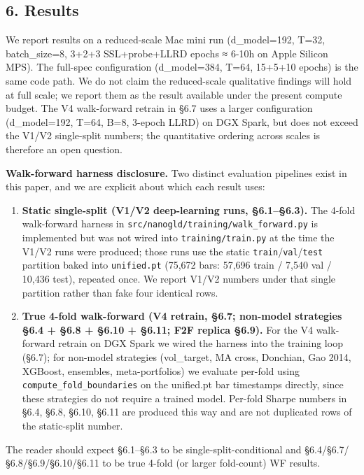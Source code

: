 \documentclass[
]{article}
\begin{document}
\subsection{6. Results}\label{results}

We report results on a reduced-scale Mac mini run (d\_model=192, T=32,
batch\_size=8, 3+2+3 SSL+probe+LLRD epochs ≈ 6-10h on Apple Silicon
MPS). The full-spec configuration (d\_model=384, T=64, 15+5+10 epochs)
is the same code path. We do not claim the reduced-scale qualitative
findings will hold at full scale; we report them as the result available
under the present compute budget. The V4 walk-forward retrain in §6.7
uses a larger configuration (d\_model=192, T=64, B=8, 3-epoch LLRD) on
DGX Spark, but does not exceed the V1/V2 single-split numbers; the
quantitative ordering across scales is therefore an open question.

\textbf{Walk-forward harness disclosure.} Two distinct evaluation
pipelines exist in this paper, and we are explicit about which each
result uses:

\begin{enumerate}
\def\labelenumi{\arabic{enumi}.}
\item
  \textbf{Static single-split (V1/V2 deep-learning runs, §6.1--§6.3).}
  The 4-fold walk-forward harness in
  \texttt{src/nanogld/training/walk\_forward.py} is implemented but was
  not wired into \texttt{training/train.py} at the time the V1/V2 runs
  were produced; those runs use the static
  \texttt{train}/\texttt{val}/\texttt{test} partition baked into
  \texttt{unified.pt} (75,672 bars: 57,696 train / 7,540 val / 10,436
  test), repeated once. We report V1/V2 numbers under that single
  partition rather than fake four identical rows.
\item
  \textbf{True 4-fold walk-forward (V4 retrain, §6.7; non-model
  strategies §6.4 + §6.8 + §6.10 + §6.11; F2F replica §6.9).} For the V4
  walk-forward retrain on DGX Spark we wired the harness into the
  training loop (§6.7); for non-model strategies (vol\_target, MA cross,
  Donchian, Gao 2014, XGBoost, ensembles, meta-portfolios) we evaluate
  per-fold using \texttt{compute\_fold\_boundaries} on the unified.pt
  bar timestamps directly, since these strategies do not require a
  trained model. Per-fold Sharpe numbers in §6.4, §6.8, §6.10, §6.11 are
  produced this way and are not duplicated rows of the static-split
  number.
\end{enumerate}

The reader should expect §6.1--§6.3 to be single-split-conditional and
§6.4/§6.7/§6.8/§6.9/§6.10/§6.11 to be true 4-fold (or larger fold-count)
WF results.
\end{document}
